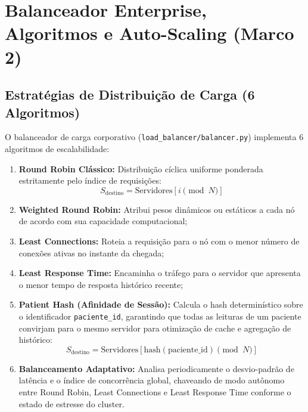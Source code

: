 \documentclass[12pt,a4paper]{article}
\begin{document}
\section{Balanceador Enterprise, Algoritmos e Auto-Scaling (Marco 2)}

\subsection{Estratégias de Distribuição de Carga (6 Algoritmos)}
O balanceador de carga corporativo (\texttt{load\_balancer/balancer.py}) implementa 6 algoritmos de escalabilidade:
\begin{enumerate}
	\item \textbf{Round Robin Clássico:} Distribuição cíclica uniforme ponderada estritamente pelo índice de requisições:
	\begin{equation}
		S_{\text{destino}} = \text{Servidores}\left[ i \pmod N \right]
	\end{equation}
	\item \textbf{Weighted Round Robin:} Atribui pesos dinâmicos ou estáticos a cada nó de acordo com sua capacidade computacional;
	\item \textbf{Least Connections:} Roteia a requisição para o nó com o menor número de conexões ativas no instante da chegada;
	\item \textbf{Least Response Time:} Encaminha o tráfego para o servidor que apresenta o menor tempo de resposta histórico recente;
	\item \textbf{Patient Hash (Afinidade de Sessão):} Calcula o hash determinístico sobre o identificador \texttt{paciente\_id}, garantindo que todas as leituras de um paciente convirjam para o mesmo servidor para otimização de cache e agregação de histórico:
	\begin{equation}
		S_{\text{destino}} = \text{Servidores}\left[ \text{hash}(\text{paciente\_id}) \pmod N \right]
	\end{equation}
	\item \textbf{Balanceamento Adaptativo:} Analisa periodicamente o desvio-padrão de latência e o índice de concorrência global, chaveando de modo autônomo entre Round Robin, Least Connections e Least Response Time conforme o estado de estresse do cluster.
\end{enumerate}
\end{document}
